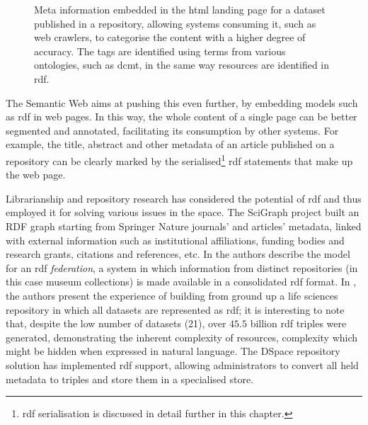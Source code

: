 \begin{figure}[thpb]
  \centering
  \caption{Meta information embedded in the \gls{html} landing page for a dataset published in a repository, allowing systems consuming it, such as web crawlers, to categorise the content with a higher degree of accuracy. The tags are identified using terms from various ontologies, such as \gls{dcmt}, in the same way resources are identified in \gls{rdf}.}
  \label{fig:meta}
\end{figure}

The Semantic Web aims at pushing this even further, by embedding models such as \gls{rdf} in web pages. In this way, the whole content of a single page can be better segmented and annotated, facilitating its consumption by other systems. For example, the title, abstract and other metadata of an article published on a repository can be clearly marked by the serialised\footnote{\gls{rdf} serialisation is discussed in detail further in this chapter.} \gls{rdf} statements that make up the web page. 

Librarianship and repository research has considered the potential of \gls{rdf} and thus employed it for solving various issues in the space. The SciGraph project \cite{scigraph} built an RDF graph starting from Springer Nature journals' and articles' metadata, linked with external information such as institutional affiliations, funding bodies and research grants, citations and references, etc.  In \cite{ichim} the authors describe the model for an \gls{rdf} \emph{federation}, a system in which information from distinct repositories (in this case museum collections) is made available in a consolidated \gls{rdf} format. In \cite{nbdc}, the authors present the experience of building from ground up a life sciences repository in which all datasets are represented as \gls{rdf}; it is interesting to note that, despite the low number of datasets (21), over $45.5$ billion \gls{rdf} triples were generated, demonstrating the inherent complexity of resources, complexity which might be hidden when expressed in natural language. The DSpace repository solution has implemented \gls{rdf} support\cite{dspacerdf}, allowing administrators to convert all held metadata to triples and store them in a specialised store.

